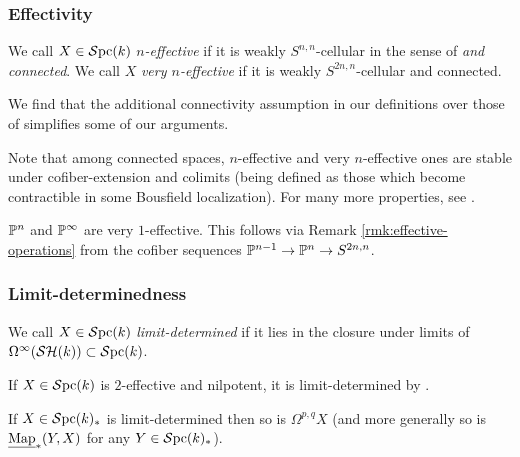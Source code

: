 \documentclass{amsart}
\numberwithin{proposition}{section}
\numberwithin{equation}{section}
\begin{document}
\subsubsection{Effectivity}
\begin{definition} \label{def:n-effective-space}
We call $X \in \Spc(k)$ \emph{$n$-effective} if it is weakly $S^{n,n}$-cellular in the sense of \cite[Definition 3.1.3]{freudenthal} \emph{and connected}.
We call $X$ \emph{very $n$-effective} if it is weakly $S^{2n,n}$-cellular and connected.
\end{definition}
We find that the additional connectivity assumption in our definitions over those of \cite{freudenthal} simplifies some of our arguments.

\begin{remark}\label{rmk:effective-operations}
Note that among connected spaces, $n$-effective and very $n$-effective ones are stable under cofiber-extension and colimits (being defined as those which become contractible in some Bousfield localization).
For many more properties, see \cite[\S3 and \S4]{freudenthal}.
\end{remark}

\begin{example} \label{ex:Poo-effective}
$\P^n$ and $\P^\infty$ are very $1$-effective.
This follows via Remark \ref{rmk:effective-operations} from the cofiber sequences $\P^{n-1} \to \P^n \to S^{2n,n}$.
\end{example}

\subsubsection{Limit-determinedness}
\begin{definition} \label{def:limit-determined}
We call $X \in \Spc(k)$ \emph{limit-determined} if it lies in the closure under limits of $\Omega^\infty(\SH(k)) \subset \Spc(k)$.
\end{definition}

\begin{example} \label{ex:resolvable-spaces}
If $X \in \Spc(k)$ is $2$-effective and nilpotent, it is limit-determined by \cite[Amplification~4.1.12]{freudenthal}.
\end{example}

\begin{example} \label{ex:loops-limit-determined}
If $X \in \Spc(k)_*$ is limit-determined then so is $\Omega^{p,q} X$ (and more generally so is $\ul\Map_*(Y,X)$ for any $Y \in \Spc(k)_*$).
\end{example}
\end{document}
